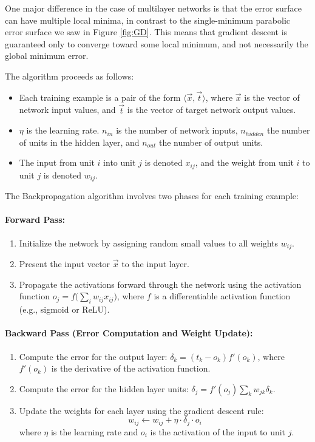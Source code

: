 \documentclass{tufte-handout}
\begin{document}
One major difference in the case of multilayer networks is that the error surface can have multiple local minima, in contrast to the single-minimum parabolic error surface we saw in Figure \ref{fig:GD}. This means that gradient descent is guaranteed only to converge toward some local minimum, and not necessarily the global minimum error.

The algorithm proceeds as follows:

\begin{itemize}
    \item Each training example is a pair of the form $\langle \Vec{x}, \Vec{t} \rangle$, where $\Vec{x}$ is the vector of network input values, and $\Vec{t}$ is the vector of target network output values.
    \item $\eta$ is the learning rate. $n_{in}$ is the number of network inputs, $n_{hidden}$ the number of units in the hidden layer, and $n_{out}$ the number of output units.
    \item The input from unit $i$ into unit $j$ is denoted $x_{ij}$, and the weight from unit $i$ to unit $j$ is denoted $w_{ij}$.
\end{itemize}

The Backpropagation algorithm involves two phases for each training example:

\paragraph{Forward Pass:} 
\begin{enumerate}
    \item Initialize the network by assigning random small values to all weights $w_{ij}$.
    \item Present the input vector $\Vec{x}$ to the input layer.
    \item Propagate the activations forward through the network using the activation function $o_j = f\big( \sum_i w_{ij} x_{ij} \big)$, where $f$ is a differentiable activation function (e.g., sigmoid or ReLU).
\end{enumerate}

\paragraph{Backward Pass (Error Computation and Weight Update):}
\begin{enumerate}
    \item Compute the error for the output layer: $\delta_k = (t_k - o_k)f'(o_k)$, where $f'(o_k)$ is the derivative of the activation function.
    \item Compute the error for the hidden layer units: $\delta_j = f'(o_j) \sum_k w_{jk} \delta_k$.
    \item Update the weights for each layer using the gradient descent rule:
    \begin{equation}
        w_{ij} \leftarrow w_{ij} + \eta \cdot \delta_j \cdot o_i
    \end{equation}
    where $\eta$ is the learning rate and $o_i$ is the activation of the input to unit $j$.
\end{enumerate}
\end{document}
